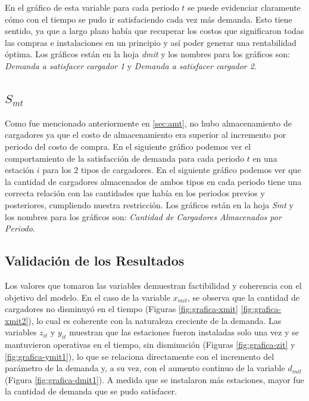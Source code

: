 \documentclass[letterpaper]{article}
\begin{document}
\begin{flushleft}
	En el gráfico de esta variable para cada periodo $t$ se puede evidenciar claramente cómo con el tiempo se pudo ir satisfaciendo cada vez más demanda. Esto tiene sentido, ya que a largo plazo había que recuperar los costos que significaron todas las compras e instalaciones en un principio y así poder generar una rentabilidad óptima. Los gráficos están en la hoja \textit{dmit} y los nombres para los gráficos son: \textit{Demanda a satisfacer cargador 1} y \textit{Demanda a satisfacer cargador 2}.

	\subsection{\texorpdfstring{$S_{mt}$}{Smt}}

	Como fue mencionado anteriormente en \ref{sec:amt}, no hubo almacenamiento de cargadores ya que el costo de almacenamiento era superior al incremento por periodo del costo de compra. En el siguiente gráfico podemos ver el comportamiento de la satisfacción de demanda para cada periodo $t$ en una estación $i$ para los 2 tipos de cargadores. En el siguiente gráfico podemos ver que la cantidad de cargadores almacenados de ambos tipos en cada periodo tiene una correcta relación con las cantidades que había en los periodos previos y posteriores, cumpliendo nuestra restricción. Los gráficos están en la hoja \textit{Smt} y los nombres para los gráficos son: \textit{Cantidad de Cargadores Almacenados por Periodo}.


	\subsection{Validación de los Resultados}

	Los valores que tomaron las variables demuestran factibilidad y coherencia con el objetivo del modelo. En el caso de la variable \(x_{mit}\), se observa que la cantidad de cargadores no disminuyó en el tiempo (Figuras \ref{fig:grafica-xmit} \ref{fig:grafica-xmit2}), lo cual es coherente con la naturaleza creciente de la demanda. Las variables \(z_{it}\) y \(y_{it}\) muestran que las estaciones fueron instaladas solo una vez y se mantuvieron operativas en el tiempo, sin disminución (Figuras \ref{fig:grafica-zit} y \ref{fig:grafica-ymit1}), lo que se relaciona directamente con el incremento del parámetro de la demanda y, a su vez, con el aumento continuo de la variable \(d_{mit}\) (Figura \ref{fig:grafica-dmit1}). A medida que se instalaron más estaciones, mayor fue la cantidad de demanda que se pudo satisfacer.


\end{flushleft}
\end{document}
